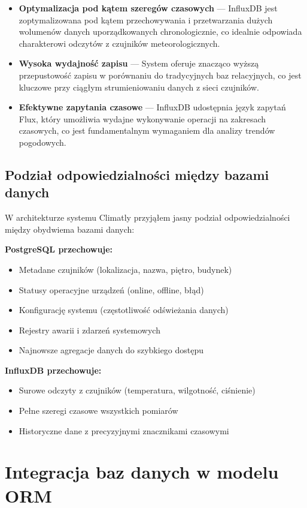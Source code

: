 \documentclass[a4paper,12pt,openany]{book}
\begin{document}
\begin{itemize}
  \item \textbf{Optymalizacja pod kątem szeregów czasowych} --- InfluxDB jest zoptymalizowana pod kątem przechowywania i przetwarzania dużych wolumenów danych uporządkowanych chronologicznie, co idealnie odpowiada charakterowi odczytów z czujników meteorologicznych.
  \item \textbf{Wysoka wydajność zapisu} --- System oferuje znacząco wyższą przepustowość zapisu w porównaniu do tradycyjnych baz relacyjnych, co jest kluczowe przy ciągłym strumieniowaniu danych z sieci czujników.
  \item \textbf{Efektywne zapytania czasowe} --- InfluxDB udostępnia język zapytań Flux, który umożliwia wydajne wykonywanie operacji na zakresach czasowych, co jest fundamentalnym wymaganiem dla analizy trendów pogodowych.
\end{itemize}

\subsection*{Podział odpowiedzialności między bazami danych}
W architekturze systemu Climatly przyjąłem jasny podział odpowiedzialności między obydwiema bazami danych:

\textbf{PostgreSQL przechowuje:}
\begin{itemize}[noitemsep,topsep=0pt]
\item Metadane czujników (lokalizacja, nazwa, piętro, budynek)
\item Statusy operacyjne urządzeń (online, offline, błąd)
\item Konfigurację systemu (częstotliwość odświeżania danych)
\item Rejestry awarii i zdarzeń systemowych
\item Najnowsze agregacje danych do szybkiego dostępu
\end{itemize}
\vspace{10pt}
\textbf{InfluxDB przechowuje:}
\begin{itemize}[noitemsep,topsep=0pt]
\item Surowe odczyty z czujników (temperatura, wilgotność, ciśnienie)
\item Pełne szeregi czasowe wszystkich pomiarów
\item Historyczne dane z precyzyjnymi znacznikami czasowymi
\end{itemize}

\section{Integracja baz danych w modelu ORM}
\end{document}
